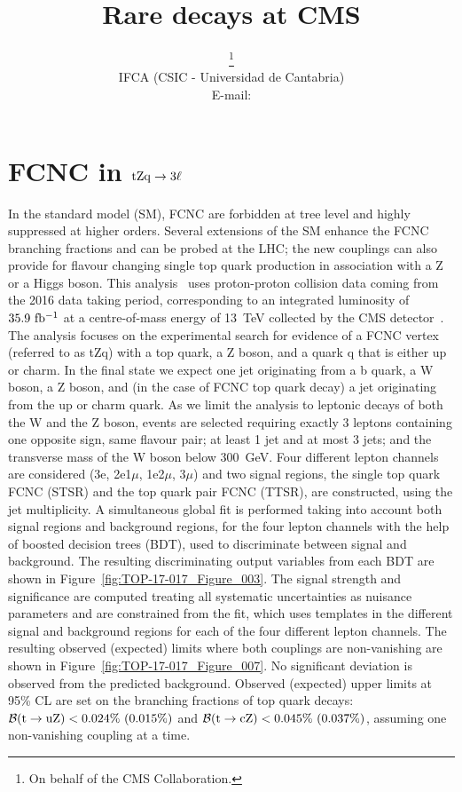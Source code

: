 \documentclass{PoS}
\title{Rare decays at CMS}
\author{\speaker{J\'onatan Piedra}\thanks{On behalf of the CMS Collaboration.}\\
        IFCA (CSIC - Universidad de Cantabria)\\
        E-mail: \email{piedra@cern.ch}}
\begin{document}
\section{FCNC in ${\rm tZq \to 3\ell}$}

In the standard model (SM), FCNC are
forbidden at tree level and highly suppressed at higher orders. Several
extensions of the SM enhance the FCNC branching fractions and can be probed at
the LHC; the new couplings can also provide for flavour changing single top
quark production in association with a Z or a Higgs boson.
This analysis~\cite{top-17-017} uses proton-proton collision data coming from the
2016 data taking period, corresponding to an integrated luminosity of
${\rm 35.9~fb^{-1}}$ at a centre-of-mass energy of 13~TeV collected by the CMS
detector~\cite{cms-detector}. The analysis focuses on the experimental search for evidence of a FCNC
vertex (referred to as tZq) with a top quark, a Z boson, and a quark q that is
either up or charm. In the final state we expect one jet originating from a b quark,
a W boson, a Z boson, and (in the case of FCNC top quark decay) a jet originating
from the up or charm quark. As we limit the analysis to leptonic decays of both the
W and the Z boson, events are selected requiring exactly 3 leptons containing one
opposite sign, same flavour pair; at least 1 jet and at most 3 jets; and the
transverse mass of the W boson below 300~GeV. Four different lepton channels are
considered (3e, 2e1$\mu$, 1e2$\mu$, 3$\mu$) and two signal regions, the single top
quark FCNC (STSR) and the top quark pair FCNC (TTSR), are constructed, using the
jet multiplicity. A simultaneous global fit is performed taking into account
both signal regions and background regions, for the four lepton channels with the
help of boosted decision trees (BDT), used to discriminate between signal and
background. The resulting discriminating output variables from each BDT are
shown in Figure~\ref{fig:TOP-17-017_Figure_003}. The signal strength and significance
are computed treating all systematic uncertainties as nuisance parameters and are
constrained from the fit, which uses templates in the different signal and
background regions for each of the four different lepton channels. The resulting
observed (expected) limits where both couplings are non-vanishing are shown in
Figure~\ref{fig:TOP-17-017_Figure_007}. No significant deviation is observed from
the predicted background. Observed (expected) upper limits at 95\% CL are set on
the branching fractions of top quark decays:
${\cal B}({\rm t \to uZ}) < 0.024\%~(0.015\%)$ and
${\cal B}({\rm t \to cZ}) < 0.045\%~(0.037\%)$, assuming one non-vanishing
coupling at a time.
\end{document}
